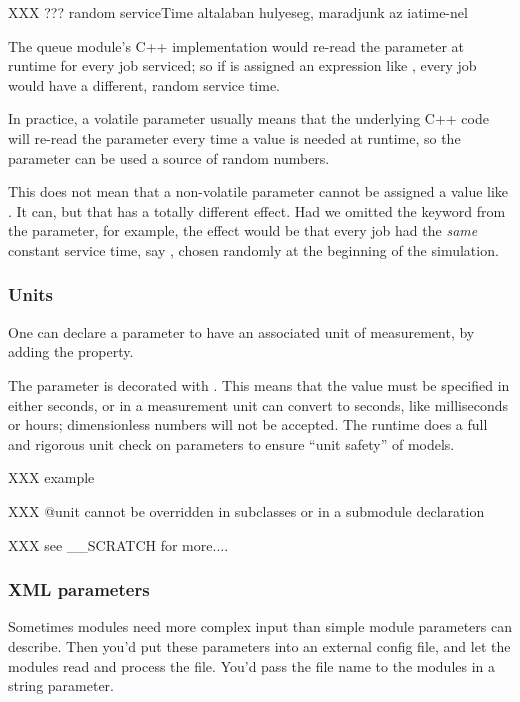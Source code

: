 XXX ??? random serviceTime altalaban hulyeseg, maradjunk az iatime-nel

The queue module's C++ implementation would re-read the 
parameter at runtime for every job serviced; so if  is
assigned an expression like , every job would have
a different, random service time.

In practice, a volatile parameter usually means that the underlying C++
code will re-read the parameter every time a value is needed at runtime, so
the parameter can be used a source of random numbers.

\begin{note}
    This does not mean that a non-volatile parameter cannot be assigned a value
    like . It can, but that has a totally different
    effect. Had we omitted the  keyword from the
     parameter, for example, the effect would be that every
    job had the \textit{same} constant service time, say ,
    chosen randomly at the beginning of the simulation.
\end{note}

\subsubsection{Units}

One can declare a parameter to have an associated unit of measurement,
by adding the  property.

The  parameter is decorated with . This means
that the value must be specified in either seconds, or in a measurement unit {\opp}
can convert to seconds, like milliseconds or hours; dimensionless numbers
will not be accepted. The {\opp} runtime does a full and rigorous unit check on
parameters to ensure ``unit safety'' of models.

XXX example

XXX @unit cannot be overridden in subclasses or in a submodule declaration

XXX see \_\_SCRATCH for more....


\subsubsection{XML parameters}

Sometimes modules need more complex input than simple module parameters
can describe. Then you'd put these parameters into an external config file,
and let the modules read and process the file. You'd pass the file name
to the modules in a string parameter.

